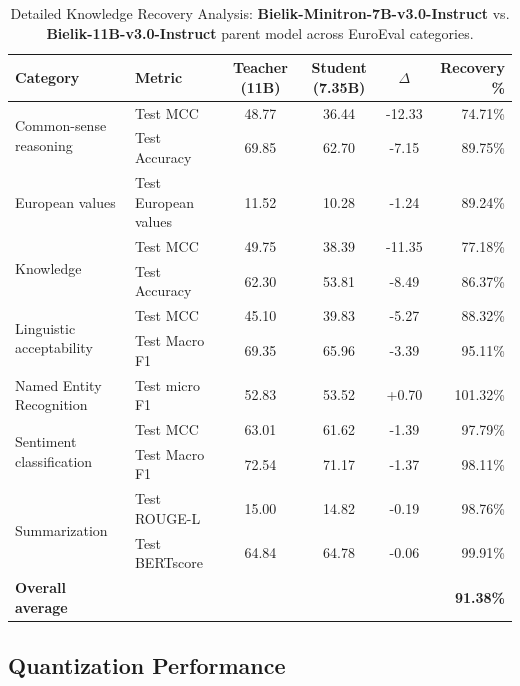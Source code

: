 \documentclass{article}
\begin{document}
\begin{table}[t]
\centering
\small
\begin{tabular}{llcccr}
\toprule
\textbf{Category} & \textbf{Metric} & \textbf{Teacher (11B)} & \textbf{Student (7.35B)} & \textbf{$\Delta$} & \textbf{Recovery \%} \\
\midrule
\multirow{2}{*}{Common-sense reasoning} & Test MCC & 48.77 & 36.44 & -12.33 & 74.71\% \\
                                        & Test Accuracy & 69.85 & 62.70 & -7.15 & 89.75\% \\
\midrule
European values & Test European values & 11.52 & 10.28 & -1.24 & 89.24\% \\
\midrule
\multirow{2}{*}{Knowledge} & Test MCC & 49.75 & 38.39 & -11.35 & 77.18\% \\
                           & Test Accuracy & 62.30 & 53.81 & -8.49 & 86.37\% \\
\midrule
\multirow{2}{*}{Linguistic acceptability} & Test MCC & 45.10 & 39.83 & -5.27 & 88.32\% \\
                                         & Test Macro F1 & 69.35 & 65.96 & -3.39 & 95.11\% \\
\midrule
Named Entity Recognition & Test micro F1 & 52.83 & 53.52 & +0.70 & 101.32\% \\
\midrule
\multirow{2}{*}{Sentiment classification} & Test MCC & 63.01 & 61.62 & -1.39 & 97.79\% \\
                                         & Test Macro F1 & 72.54 & 71.17 & -1.37 & 98.11\% \\
\midrule
\multirow{2}{*}{Summarization}           & Test ROUGE-L & 15.00 & 14.82 & -0.19 & 98.76\% \\
                                         & Test BERTscore & 64.84 & 64.78 & -0.06 & 99.91\% \\
\midrule
\textbf{Overall average} & & & & & \textbf{91.38\%} \\
\bottomrule
\end{tabular}
\caption{Detailed Knowledge Recovery Analysis: \textbf{Bielik-Minitron-7B-v3.0-Instruct} vs. \textbf{Bielik-11B-v3.0-Instruct} parent model across EuroEval categories.}
\label{tab:euroeval}
\end{table}

\subsection{Quantization Performance}
\end{document}

